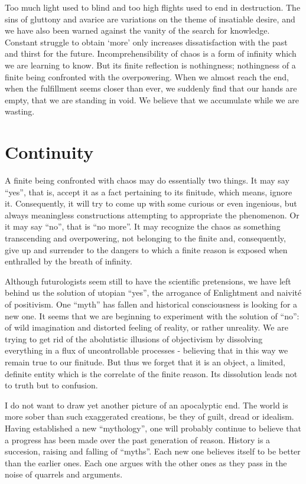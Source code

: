 Too much light used to blind and too high flights used to end in destruction.
The sins of gluttony and avarice are variations on the theme of insatiable
desire, and we have also been warned against the vanity of the search for
knowledge. Constant struggle to obtain `more' only increases dissatisfaction
with the past and thirst for the future. Incomprehensibility of chaos is a 
form of infinity 
which we are learning to know. But its finite reflection is nothingness; 
nothingness of a finite being confronted with the overpowering. When we almost
reach the end, when the fulfillment seems closer than ever, we suddenly find 
that our hands are empty, that we are standing in void. We believe that we 
accumulate while we are wasting.

\section{Continuity}
A finite being confronted with chaos may do essentially two things. It may
say ``yes'', that is, accept it as a fact pertaining to its finitude, which 
means, ignore it. Consequently, it will
try to come up with some curious or even ingenious, but always meaningless
 constructions attempting to appropriate the phenomenon. Or it may
say ``no'', that is ``no more''. It may recognize the chaos as something 
transcending and overpowering, not belonging to the finite and, consequently,
give up and surrender to the dangers to which a finite reason is
exposed when enthralled by the breath of infinity.

Although futurologists seem still to have the scientific pretensions, 
we have left behind us the solution of utopian ``yes'', the arrogance of 
Enlightment and naivit\'{e} of positivism. One ``myth'' has fallen and 
historical consciousness is looking for a new one. It seems that we are 
beginning to experiment with the solution of ``no'':
of wild imagination and distorted feeling of reality, or rather unreality.
We are trying to get rid of the abolutistic illusions of objectivism by 
dissolving everything in a flux of uncontrollable processes - believing that 
in this way we remain true to our finitude. But thus we forget that it is an
object, a limited, definite entity which is the correlate of the finite reason.
Its dissolution leads not to truth but to confusion.

I do not want to draw yet another  picture of an apocalyptic end.
The world is  more sober than such exaggerated  creations, be they of guilt, 
dread or idealism.
Having established a new ``mythology'', one will probably continue to believe
that a progress has been made over the past generation of reason. History is
a succesion, raising and falling of ``myths''. Each new one believes itself
to be better than the earlier ones. Each one argues with the other ones as
they pass in the noise of quarrels and arguments. 

